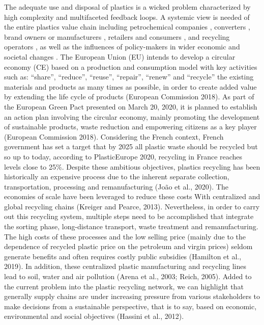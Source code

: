 \documentclass[]{elsarticle} %
\begin{document}
The adequate use and disposal of plastics is a wicked problem characterized by high complexity and multifaceted feedback loops.
A systemic view is needed of the entire plastics value chain including petrochemical companies \citep{Iles2013, DeVargasMores2018}, converters \citep{Paletta2019}, brand owners or manufacturers \citep{Gong2020, Ma2020}, retailers and consumers \citep{Confente2020, Friedrich2020, Filho2021}, and recycling operators \citep{Huysveld2019, Pazienza2020}, as well as the influences of policy-makers in wider economic and societal changes \citep{Paletta2019}.
The European Union (EU) intends to develop a circular economy (CE) based on a production and consumption model with key activities such as: ``share'', ``reduce'', ``reuse'', ``repair'', ``renew'' and ``recycle'' the existing materials and products as many times as possible, in order to create added value by extending the life cycle of products (European Commission 2018).
As part of the European Green Pact presented on March 20, 2020, it is planned to establish an action plan involving the circular economy, mainly promoting the development of sustainable products, waste reduction and empowering citizens as a key player (European Commission 2018).
Considering the French context, French government has set a target that by 2025 all plastic waste should be recycled but so up to today, according to PlasticEurope 2020, recycling in France reaches levels close to 25\%.
Despite these ambitious objectives, plastics recycling has been historically an expensive process due to the inherent separate collection, transportation, processing and remanufacturing (João et al., 2020).
The economies of scale have been leveraged to reduce these costs With centralized and global recycling chains (Kreiger and Pearce, 2013).
Nevertheless, in order to carry out this recycling system, multiple steps need to be accomplished that integrate the sorting phase, long-distance transport, waste treatment and remanufacturing.
The high costs of these processes and the low selling price (mainly due to the dependence of recycled plastic price on the petroleum and virgin prices) seldom generate benefits and often requires costly public subsidies (Hamilton et al., 2019).
In addition, these centralized plastic manufacturing and recycling lines lead to soil, water and air pollution (Arena et al., 2003; Reich, 2005).
Added to the current problem into the plastic recycling network, we can highlight that generally supply chains are under increasing pressure from various stakeholders to make decisions from a sustainable perspective, that is to say, based on economic, environmental and social objectives (Hassini et al., 2012).
\end{document}
